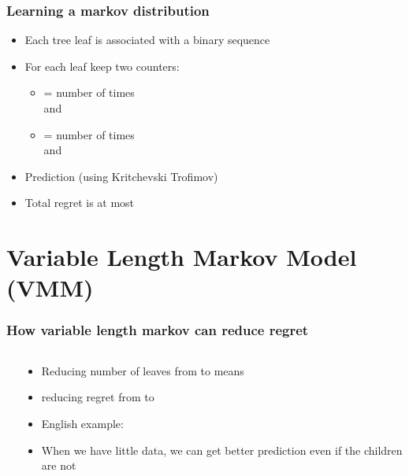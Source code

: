 \documentclass[handout]{beamer}
\begin{document}
\begin{frame}
\frametitle{Learning a markov distribution}
\begin{itemize}
\item Each tree leaf is associated with a binary sequence
\item For each leaf keep two counters:
\begin{itemize}
\item {} = number of times  \\ and 
\item {} = number of times  \\ and 
\end{itemize}
\item Prediction (using Kritchevski Trofimov)
\R{\[p(x_t=1 | x_{t-1}=y_1,\ldots,x_{t-k}=y_k) 
= \frac{b_{y_1,\ldots,y_k}+1/2}{a_{y_1,\ldots,y_k}+b_{y_1,\ldots,y_k}+1}\]}
\item Total regret is at most 
\end{itemize}
\end{frame}

\section{Variable Length Markov Model (VMM)}


\begin{frame}
\frametitle{How variable length markov can reduce regret}
\begin{columns}
\begin{column}[T]{5cm}
\end{column}
\begin{column}[t]{8cm}
\begin{itemize}
\item Reducing number of leaves from  to  means 
\item reducing regret from  to 
\item English example: \\
\pause {} \pause {}
\item When we have little data, we can get better prediction even if the children are not 
\end{itemize}
\end{column}
\end{columns}
\end{frame}
\end{document}
